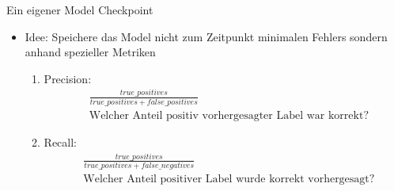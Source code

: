 \begin{frame}{Ein eigener Model Checkpoint}
\begin{itemize}
\item Idee: Speichere das Model nicht zum Zeitpunkt minimalen Fehlers sondern anhand spezieller Metriken
\begin{enumerate}
\item Precision: 
\begin{align*}
&\frac{true\_positives}{true\_positives + false\_positives}\\
&\text{Welcher Anteil positiv vorhergesagter Label war korrekt?}
\end{align*}
\item Recall:
\begin{align*}
&\frac{true\_positives}{true\_positives + false\_negatives}\\
&\text{Welcher Anteil positiver Label wurde korrekt vorhergesagt?}
\end{align*}
\end{enumerate}
\end{itemize}
\end{frame}

